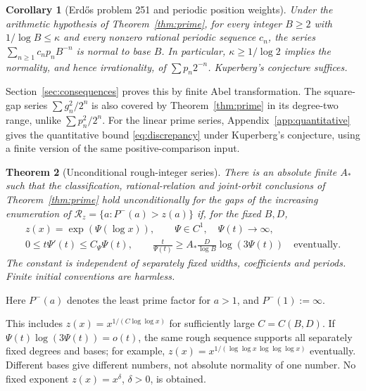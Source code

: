\documentclass[11pt,a4paper]{article}
\newtheorem{theorem}{Theorem}[section]
\newtheorem{corollary}[theorem]{Corollary}
\begin{document}
\begin{corollary}[Erd\H os problem 251 and periodic position weights]
\label{cor:erdos251}
Under the arithmetic hypothesis of Theorem~\ref{thm:prime},
for every integer $B\ge2$ with
$1/\log B\le\kappa$ and every nonzero rational periodic sequence $c_n$,
the series $\sum_{n\ge1}c_np_nB^{-n}$ is normal to base $B$.
In particular, $\kappa\ge1/\log2$ implies the normality, and hence
irrationality, of $\sum p_n2^{-n}$. Kuperberg's conjecture suffices.
\end{corollary}
Section~\ref{sec:consequences} proves this by finite Abel transformation.
The square-gap series $\sum g_n^2/2^n$ is also covered by
Theorem~\ref{thm:prime} in its degree-two range, unlike $\sum p_n^2/2^n$.
For the linear prime series, Appendix~\ref{app:quantitative} gives the
quantitative bound \eqref{eq:discrepancy} under Kuperberg's conjecture,
using a finite version of the same positive-comparison input.

\begin{theorem}[Unconditional rough-integer series]\label{thm:rough}
There is an absolute finite $A_*$ such that the classification,
rational-relation and joint-orbit conclusions of Theorem~\ref{thm:prime}
hold unconditionally for the gaps of the increasing enumeration of
$\mathcal R_z=\{a:P^-(a)>z(a)\}$ if, for the fixed $B,D$,
\begin{equation}\label{eq:roughrangeintro}
 \begin{gathered}
 z(x)=\exp(\Psi(\log x)),\qquad \Psi\in C^1,\quad \Psi(t)\to\infty,\\
 0\le t\Psi'(t)\le C_\Psi\Psi(t),\qquad
 \frac t{\Psi(t)}\ge A_*\frac D{\log B}\log(3\Psi(t))
                    \quad\text{eventually}.
 \end{gathered}
\end{equation}
The constant is independent of separately fixed widths, coefficients
and periods. Finite initial conventions are harmless.
\end{theorem}

Here $P^-(a)$ denotes the least prime factor for $a>1$, and $P^-(1):=\infty$.

This includes $z(x)=x^{1/(C\log\log x)}$ for sufficiently large
$C=C(B,D)$. If $\Psi(t)\log(3\Psi(t))=o(t)$, the same rough
sequence supports all separately fixed degrees and bases; for example,
$z(x)=x^{1/(\log\log x\,\log\log\log x)}$ eventually. Different bases
give different numbers, not absolute normality of one number.
No fixed exponent $z(x)=x^\delta$, $\delta>0$, is obtained.
\end{document}
